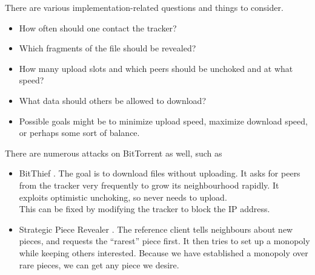 		There are various implementation-related questions and things to consider.
		\begin{itemize}
			\item How often should one contact the tracker?
			\item Which fragments of the file should be revealed?
			\item How many upload slots and which peers should be unchoked and at what speed?
			\item What data should others be allowed to download?
			\item Possible goals might be to minimize upload speed, maximize download speed, or perhaps some sort of balance.
		\end{itemize}

		There are numerous attacks on BitTorrent as well, such as
		\begin{itemize}
			\item BitThief \cite{bitthief}. The goal is to download files without uploading. It asks for peers from the tracker very frequently to grow its neighbourhood rapidly. It exploits optimistic unchoking, so never needs to upload.\\
			This can be fixed by modifying the tracker to block the IP address.
			\item Strategic Piece Revealer \cite{strategic-piece-revealer}. The reference client tells neighbours about new pieces, and requests the ``rarest'' piece first. It then tries to set up a monopoly while keeping others interested. Because we have established a monopoly over rare pieces, we can get any piece we desire. %
		\end{itemize}